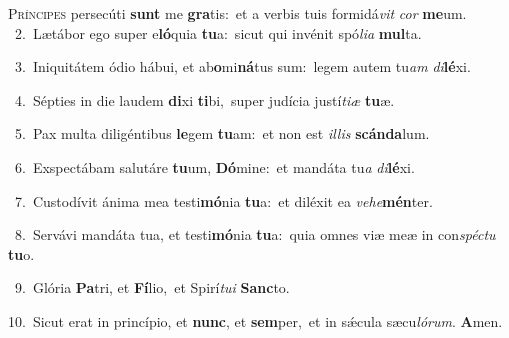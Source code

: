 \lettrine{\initial\textcolor{\initialcolor}{P}}{ríncipes} persecúti \textbf{sunt} me \textbf{gra}\-tis:~\star et a verbis tuis formidá\textit{vit} \textit{cor} \textbf{me}\-um.\\
{\numbfont\textcolor{\numbcolor}{~2.}}~Lætábor ego super e\-\textbf{ló}\-quia \textbf{tu}\-a:~\star sicut qui invénit spó\-\textit{li}\-\textit{a} \textbf{mul}\-ta.\par
{\numbfont\textcolor{\numbcolor}{~3.}}~Iniquitátem ódio hábui, et ab\-\textbf{o}\-mi\-\textbf{ná}\-tus sum:~\star legem autem tu\textit{am} \textit{di}\-\textbf{lé}xi.\par
{\numbfont\textcolor{\numbcolor}{~4.}}~Sépties in die laudem \textbf{di}\-xi \textbf{ti}\-bi,~\star super judícia justí\-\textit{ti}\-\textit{æ} \textbf{tu}\-æ.\par
{\numbfont\textcolor{\numbcolor}{~5.}}~Pax multa diligéntibus \textbf{le}\-gem \textbf{tu}\-am:~\star et non est \textit{il}\-\textit{lis} \textbf{scán}\-\textbf{da}lum.\par
{\numbfont\textcolor{\numbcolor}{~6.}}~Exspectábam salutáre \textbf{tu}\-um, \textbf{Dó}\-mine:~\star et mandáta tu\textit{a} \textit{di}\-\textbf{lé}xi.\par
{\numbfont\textcolor{\numbcolor}{~7.}}~Custodívit ánima mea testi\-\textbf{mó}\-nia \textbf{tu}\-a:~\star et diléxit ea \textit{ve}\-\textit{he}\textbf{mén}ter.\par
{\numbfont\textcolor{\numbcolor}{~8.}}~Servávi mandáta tua, et testi\-\textbf{mó}\-nia \textbf{tu}\-a:~\star quia omnes viæ meæ in con\-\textit{spéc}\-\textit{tu} \textbf{tu}\-o.\par
{\numbfont\textcolor{\numbcolor}{~9.}}~Glória \textbf{Pa}\-tri, et \textbf{Fí}\-lio,~\star et Spirí\-\textit{tu}\-\textit{i} \textbf{Sanc}\-to.\par
{\numbfont\textcolor{\numbcolor}{10.}}~Sicut erat in princípio, et \textbf{nunc}\-, et \textbf{sem}\-per,~\star et in sǽcula sæcu\-\textit{ló}\-\textit{rum}. \textbf{A}\-men.\par

